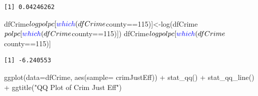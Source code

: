 \documentclass[]{article}
\newenvironment{Shaded}{}{}
\newcommand{\DataTypeTok}[1]{#1}
\newcommand{\DecValTok}[1]{#1}
\newcommand{\KeywordTok}[1]{\textcolor[rgb]{0.00,0.00,1.00}{#1}}
\newcommand{\NormalTok}[1]{#1}
\newcommand{\OperatorTok}[1]{#1}
\newcommand{\StringTok}[1]{\textcolor[rgb]{0.00,0.50,0.50}{#1}}
\begin{document}
\begin{verbatim}
[1] 0.04246262
\end{verbatim}

\begin{Shaded}
\begin{Highlighting}[]
\NormalTok{dfCrime}\OperatorTok{$}\NormalTok{logpolpc[}\KeywordTok{which}\NormalTok{(dfCrime}\OperatorTok{$}\NormalTok{county}\OperatorTok{==}\DecValTok{115}\NormalTok{)]<-}\KeywordTok{log}\NormalTok{(dfCrime}\OperatorTok{$}\NormalTok{polpc[}\KeywordTok{which}\NormalTok{(dfCrime}\OperatorTok{$}\NormalTok{county}\OperatorTok{==}\DecValTok{115}\NormalTok{)])}
\NormalTok{dfCrime}\OperatorTok{$}\NormalTok{logpolpc[}\KeywordTok{which}\NormalTok{(dfCrime}\OperatorTok{$}\NormalTok{county}\OperatorTok{==}\DecValTok{115}\NormalTok{)]}
\end{Highlighting}
\end{Shaded}

\begin{verbatim}
[1] -6.240553
\end{verbatim}

\begin{Shaded}
\end{Shaded}

\begin{Shaded}
\begin{Highlighting}[]
\KeywordTok{ggplot}\NormalTok{(}\DataTypeTok{data=}\NormalTok{dfCrime, }\KeywordTok{aes}\NormalTok{(}\DataTypeTok{sample=}\NormalTok{ crimJustEff)) }\OperatorTok{+}\StringTok{ }\KeywordTok{stat_qq}\NormalTok{() }\OperatorTok{+}\StringTok{ }\KeywordTok{stat_qq_line}\NormalTok{() }\OperatorTok{+}\StringTok{ }
\StringTok{  }\KeywordTok{ggtitle}\NormalTok{(}\StringTok{"QQ Plot of Crim Just Eff"}\NormalTok{)}
\end{Highlighting}
\end{Shaded}
\end{document}
